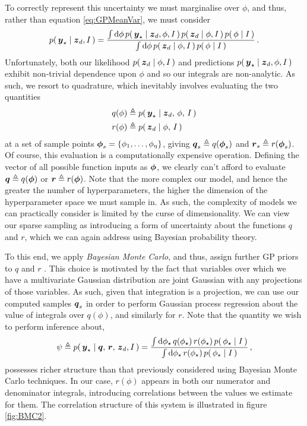 \documentclass{acmsmall}
\begin{document}
To correctly represent this uncertainty we must marginalise over $\phi$, and thus, rather than equation \eqref{eq:GPMeanVar}, we must consider
\begin{equation} \label{eq:Marginalising}
 \p{\vyst}{\vzD,I}=\frac{\int\ud\phi\, \p{\vyst}{\vzD,\phi,I}\p{\vzD}{\phi,I}\p{\phi}{I}}
{\int\ud\phi\, \p{\vzD}{\phi,I}\p{\phi}{I}}\,.
\end{equation}
Unfortunately, both our likelihood $p\!\left(\,\boldsymbol{z}_d\mid\phi,I\,\right)$ and predictions $p\!\left(\,\boldsymbol{y}_\star\mid\boldsymbol{z}_d,\phi,I\,\right)$ exhibit non-trivial dependence upon $\phi$ and so our integrals are non-analytic. As such, we resort to quadrature, which inevitably involves evaluating the two quantities
\begin{equation}
\begin{split}
q(\phi)& \triangleq p\!\left(\,\boldsymbol{y}_\star\mid\boldsymbol{z}_d,\,\phi,\,I\,\right) \\
r(\phi)& \triangleq p\!\left(\,\boldsymbol{z}_d\mid\phi,\,I\,\right)
\end{split}
\end{equation}
at a set of sample points $\boldsymbol{\phi}_s=\{\phi_1,\ldots,\phi_\eta\}$, giving $\boldsymbol{q}_s\triangleq q(\boldsymbol{\phi}_s)$ and $\boldsymbol{r}_s\triangleq r(\boldsymbol{\phi}_s)$. Of course, this evaluation is a computationally expensive operation. Defining the vector of all possible function inputs as $\boldsymbol{\phi}$, we clearly can't afford to evaluate $\boldsymbol{q}\triangleq q(\boldsymbol{\phi})$ or $\boldsymbol{r}\triangleq r(\boldsymbol{\phi})$. Note that the more complex our model, and hence the greater the number of hyperparameters, the higher the dimension of the hyperparameter space we must sample in. As such, the complexity of models we can practically consider is limited by the curse of dimensionality. We can view our sparse sampling as introducing a form of uncertainty about the functions $q$ and $r$, which we can again address using Bayesian probability theory. 

To this end, we apply \emph{Bayesian Monte Carlo}, and thus, assign further GP priors to $q$ and $r$ \cite{BZMonteCarlo}. This choice is motivated by the fact that variables over which we have a multivariate Gaussian distribution are joint Gaussian with any projections of those variables. As such, given that integration is a projection, we can use our computed samples $\boldsymbol{q}_s$ in order to perform Gaussian process regression about the value of integrals over $q(\phi)$, and similarly for $r$. Note that the quantity we wish to perform inference about, 
\begin{equation}
 \psi\triangleq p\!\left(\,\boldsymbol{y}_\star\mid\boldsymbol{q},\,\boldsymbol{r},\,\boldsymbol{z}_d,I\,\right)= \frac{\int\mathrm{d}\phi_\star\, q(\phi_\star)\,r(\phi_\star)\,p\!\left(\,\phi_\star\mid I\,\right)}
{\int\mathrm{d}\phi_\star\,r(\phi_\star)\,p\!\left(\,\phi_\star\mid I\,\right)}\,,
\end{equation} 
possesses richer structure than that previously considered using Bayesian Monte Carlo techniques. In our case, $r(\phi)$ appears in both our numerator and denominator integrals, introducing correlations between the values we estimate for them. The correlation structure of this system is illustrated in figure \ref{fig:BMC2}. 
\end{document}
